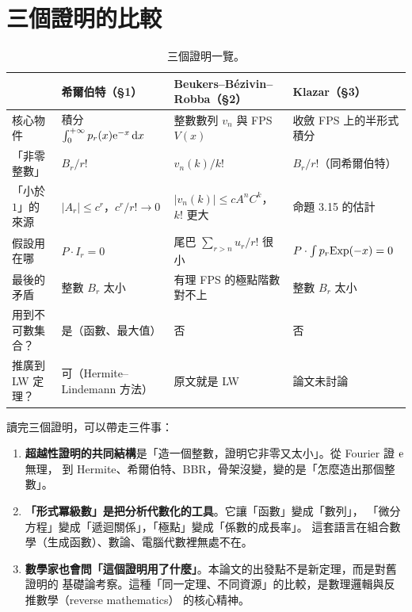 \section{三個證明的比較}\label{sec:compare}

\begin{table}[htbp]
\centering
\small
\begin{tabular}{@{}>{\raggedright\arraybackslash}p{2.6cm}>{\raggedright\arraybackslash}p{4.2cm}>{\raggedright\arraybackslash}p{4.2cm}>{\raggedright\arraybackslash}p{4.2cm}@{}}
\toprule
 & 希爾伯特（§1） & Beukers--Bézivin--Robba（§2） & Klazar（§3） \\
\midrule
核心物件 & 積分 $\int_0^{+\infty}p_r(x)\mathrm{e}^{-x}\,\mathrm{d} x$ & 整數數列 $v_n$ 與 FPS $V(x)$ & 收斂 FPS 上的半形式積分 \\
「非零整數」 & $B_r/r!$ & $v_n(k)/k!$ & $B_r/r!$（同希爾伯特） \\
「小於 $1$」的來源 & $\lvert A_r\rvert\le c^r$，$c^r/r!\to0$ & $\lvert v_n(k)\rvert\le cA^nC^k$，$k!$ 更大 & 命題 3.15 的估計 \\
假設用在哪 & $P\cdot I_r=0$ & 尾巴 $\sum_{r>n}u_r/r!$ 很小 & $P\cdot\int p_r\mathrm{Exp}(-x)=0$ \\
最後的矛盾 & 整數 $B_r$ 太小 & 有理 FPS 的極點階數對不上 & 整數 $B_r$ 太小 \\
用到不可數集合？ & 是（函數、最大值） & 否 & 否 \\
推廣到 LW 定理？ & 可（Hermite--Lindemann 方法） & 原文就是 LW & 論文未討論 \\
\bottomrule
\end{tabular}
\caption{三個證明一覽。}
\end{table}

讀完三個證明，可以帶走三件事：
\begin{enumerate}
  \item \textbf{超越性證明的共同結構}是「造一個整數，證明它非零又太小」。從 Fourier 證 $\mathrm{e}$ 無理，
        到 Hermite、希爾伯特、BBR，骨架沒變，變的是「怎麼造出那個整數」。
  \item \textbf{「形式冪級數」是把分析代數化的工具}。它讓「函數」變成「數列」，
        「微分方程」變成「遞迴關係」，「極點」變成「係數的成長率」。
        這套語言在組合數學（生成函數）、數論、電腦代數裡無處不在。
  \item \textbf{數學家也會問「這個證明用了什麼」}。本論文的出發點不是新定理，而是對舊證明的
        基礎論考察。這種「同一定理、不同資源」的比較，是數理邏輯與反推數學（reverse mathematics）
        的核心精神。
\end{enumerate}

